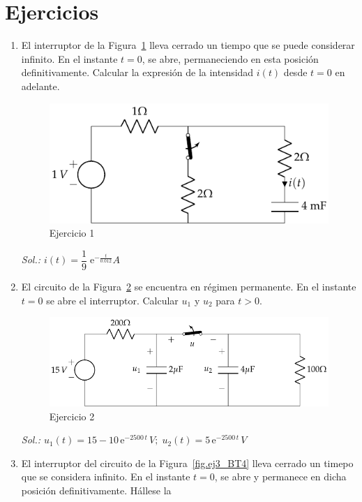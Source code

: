 \section{Ejercicios}
	
\begin{enumerate}
\item El interruptor de la Figura~\ref{fig.ej1_BT4} lleva cerrado un
  tiempo que se puede considerar infinito. En el instante $t=0$, se
  abre, permaneciendo en esta posición definitivamente. Calcular la
  expresión de la intensidad $i(t)$ desde $t=0$ en adelante.
  \begin{figure}[H]
    \centering \includegraphics{../figs/ej1_BT4.pdf}
    \caption{Ejercicio 1}
    \label{fig.ej1_BT4}
  \end{figure}
  \emph{Sol.: $i(t)=\dfrac{1}{9}\; \mathrm{e}^{-\frac{t}{0.012}} A$}
\item El circuito de la Figura~\ref{fig.ej2_BT4} se encuentra en
  régimen permanente. En el instante $t=0$ se abre el
  interruptor. Calcular $u_1$ y $u_2$ para $t>0$.
  \begin{figure}[H]
    \centering \includegraphics{../figs/ej2_BT4.pdf}
    \caption{Ejercicio 2}
    \label{fig.ej2_BT4}
  \end{figure}
  \emph{Sol.:
    $u_1(t)=15-10\,\mathrm{e}^{-2500\,t}\,V;\;
    u_2(t)=5\,\mathrm{e}^{-2500\,t}\,V$}
\item El interruptor del circuito de la Figura~\ref{fig.ej3_BT4} lleva
  cerrado un timepo que se considera infinito. En el instante $t=0$,
  se abre y permanece en dicha posición definitivamente. Hállese la

\end{enumerate}
